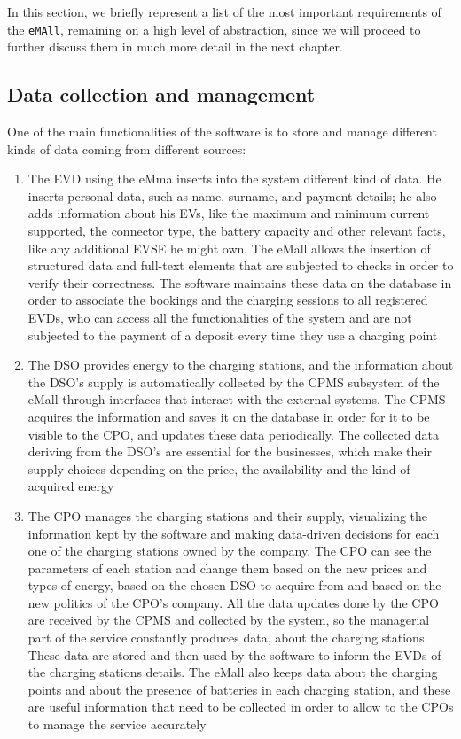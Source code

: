 In this section, we briefly represent a list of the most important requirements of the \verb|eMAll|, remaining on a high level of abstraction, since we will proceed to further discuss them in much more detail in the next chapter.
\subsection{Data collection and management}
One of the main functionalities of the software is to store and manage different kinds of data coming from different sources:
\begin{enumerate}
    \item The EVD using the eMma inserts into the system different kind of data. He inserts personal data, such as name, surname, and payment details; he also adds information about his EVs, like the maximum and minimum current supported, the connector type, the battery capacity and other relevant facts, like any additional EVSE he might own. The eMall allows the insertion of structured data and full-text elements that are subjected to checks in order to verify their correctness. The software maintains these data on the database in order to associate the bookings and the charging sessions to all registered EVDs, who can access all the functionalities of the system and are not subjected to the payment of a deposit every time they use a charging point
    \item The DSO provides energy to the charging stations, and the information about the DSO's supply is automatically collected by the CPMS subsystem of the eMall through interfaces that interact with the external systems. The CPMS acquires the information and saves it on the database in order for it to be visible to the CPO, and updates these data periodically. The collected data deriving from the DSO's are essential for the businesses, which make their supply choices depending on the price, the availability and the kind of acquired energy 
    \item The CPO manages the charging stations and their supply, visualizing the information kept by the software and making data-driven decisions for each one of the charging stations owned by the company. The CPO can see the parameters of each station and change them based on the new prices and types of energy, based on the chosen DSO to acquire from and based on the new politics of the CPO's company. All the data updates done by the CPO are received by the CPMS and collected by the system, so the managerial part of the service constantly produces data, about the charging stations. These data are stored and then used by the software to inform the EVDs of the charging stations details. The eMall also keeps data about the charging points and about the presence of batteries in each charging station, and these are useful information that need to be collected in order to allow to the CPOs to manage the service accurately

\end{enumerate}
